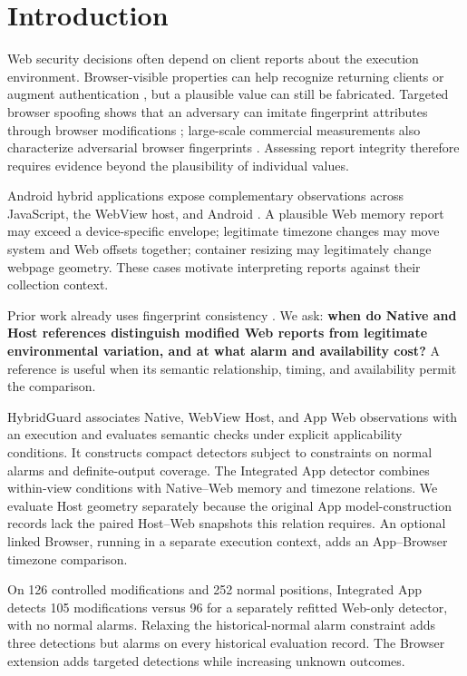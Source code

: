 \hypertarget{sec:1}{%
\section{Introduction}\label{sec:1}}

Web security decisions often depend on client reports about the execution environment. Browser-visible properties can help recognize returning clients or augment authentication \cite{ref01,ref02}, but a plausible value can still be fabricated. Targeted browser spoofing shows that an adversary can imitate fingerprint attributes through browser modifications \cite{ref03}; large-scale commercial measurements also characterize adversarial browser fingerprints \cite{ref16}. Assessing report integrity therefore requires evidence beyond the plausibility of individual values.



Android hybrid applications expose complementary observations across JavaScript, the WebView host, and Android \cite{ref11}. A plausible Web memory report may exceed a device-specific envelope; legitimate timezone changes may move system and Web offsets together; container resizing may legitimately change webpage geometry. These cases motivate interpreting reports against their collection context.

Prior work already uses fingerprint consistency \cite{ref04,ref06,ref07}. We ask: \textbf{when do Native and Host references distinguish modified Web reports from legitimate environmental variation, and at what alarm and availability cost?} A reference is useful when its semantic relationship, timing, and availability permit the comparison.

HybridGuard associates Native, WebView Host, and App Web observations with an execution and evaluates semantic checks under explicit applicability conditions. It constructs compact detectors subject to constraints on normal alarms and definite-output coverage. The Integrated App detector combines within-view conditions with Native--Web memory and timezone relations. We evaluate Host geometry separately because the original App model-construction records lack the paired Host--Web snapshots this relation requires. An optional linked Browser, running in a separate execution context, adds an App--Browser timezone comparison.

On 126 controlled modifications and 252 normal positions, Integrated App detects 105 modifications versus 96 for a separately refitted Web-only detector, with no normal alarms. Relaxing the historical-normal alarm constraint adds three detections but alarms on every historical evaluation record. The Browser extension adds targeted detections while increasing unknown outcomes.

